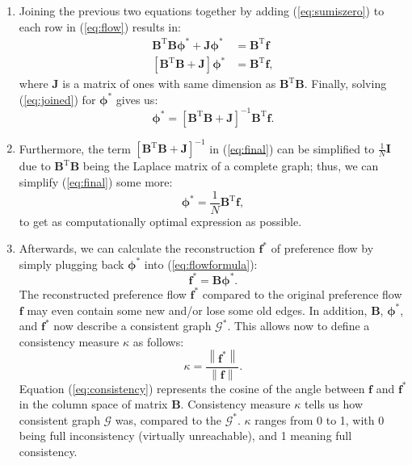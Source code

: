 \documentclass[letterpaper, 10 pt, conference]{ieeeconf}
\newcommand{\matr}[1]{\mathbold{#1}}
\newcommand{\graph}[1]{\mathcal{#1}}
\newcommand{\T}{\mathrm{T}}
\begin{document}
\begin{enumerate}
    \item Joining the previous two equations together by adding (\ref{eq:sumiszero}) to each row in (\ref{eq:flow}) results in:
    \begin{align}
    \matr{B}^\T \matr{B} \matr{\phi^*} + \matr{J} \matr{\phi^*} &= \matr{B}^\T \matr{f} \nonumber \\
    \label{eq:joined}
    \left[\matr{B}^\T \matr{B} + \matr{J} \right] \matr{\phi^*} &= \matr{B}^\T \matr{f},
    \end{align}
    where $\matr{J}$ is a matrix of ones with same dimension as $\matr{B}^\T \matr{B}$.
    Finally, solving (\ref{eq:joined}) for $\matr{\phi^*}$ gives us:
    \begin{equation}
    \label{eq:final}
    \matr{\phi^*} = \left[\matr{B}^\T \matr{B} + \matr{J} \right]^{-1} \matr{B}^\T \matr{f}.
    \end{equation}
    \item Furthermore, the term $\left[ \matr{B}^\T \matr{B} + \matr{J} \right]^{-1}$ in (\ref{eq:final}) can be simplified to $\frac{1}{N} \matr{I}$ due to $\matr{B}^\T \matr{B}$ being the Laplace matrix of a complete graph; thus, we can simplify (\ref{eq:final}) some more:
    \begin{equation}
    \matr{\phi^*} = \frac{1}{N} \matr{B}^\T \matr{f},
    \end{equation}
    to get as computationally optimal expression as possible.
    
    \item Afterwards, we can calculate the reconstruction $\matr{f}^*$ of preference  flow by simply plugging back $\matr{\phi^*}$ into (\ref{eq:flowformula}):
    \begin{equation}
    \matr{f^*} = \matr{B} \matr{\phi^*}.
    \end{equation}
    The reconstructed preference flow $\matr{f^*}$ compared to the original preference flow $\matr{f}$ may even contain some new and/or lose some old edges.
    In addition, $\matr{B}$, $\matr{\phi^*}$, and $\matr{f^*}$ now describe a consistent graph $\graph{G}^*$.
    This allows now to define a consistency measure $\kappa$ as follows:
    \begin{equation}
    \label{eq:consistency}
    \kappa = \frac{\left \lVert \matr{f^*} \right \rVert}{\left \lVert \matr{f} \right \rVert}.
    \end{equation}
    Equation (\ref{eq:consistency}) represents the cosine of the angle between $\matr{f}$ and $\matr{f^*}$ in the column space of matrix $\matr{B}$.
    Consistency measure $\kappa$ tells us how consistent graph $\graph{G}$ was, compared to the $\graph{G}^*$.
    $\kappa$ ranges from 0 to 1, with 0 being full inconsistency (virtually unreachable), and 1 meaning full consistency.
    
  \end{enumerate}
  
\end{document}
